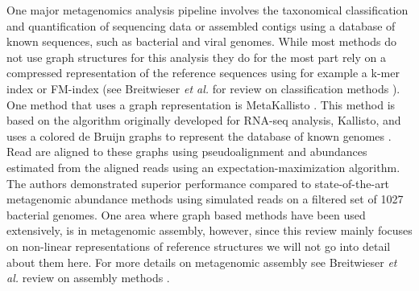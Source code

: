 One major metagenomics analysis pipeline involves the taxonomical classification and quantification of sequencing data or assembled contigs using a database of known sequences, such as bacterial and viral genomes. 
While most methods do not use graph structures for this analysis they do for the most part rely on a compressed representation of the reference sequences using for example a k-mer index or FM-index (see Breitwieser \textit{et al.} for review on classification methods \cite{Breitwieser2017-yp}). 
One method that uses a graph representation is MetaKallisto \cite{Schaeffer2017-fh}. 
This method is based on the algorithm originally developed for RNA-seq analysis, Kallisto, and uses a colored de Bruijn graphs to represent the database of known genomes \cite{Bray_2016}. 
Read are aligned to these graphs using pseudoalignment and abundances estimated from the aligned reads using an expectation-maximization algorithm. 
The authors demonstrated superior performance compared to state-of-the-art metagenomic abundance methods using simulated reads on a filtered set of 1027 bacterial genomes.
One area where graph based methods have been used extensively, is in metagenomic assembly, however, since this review mainly focuses on non-linear representations of reference structures we will not go into detail about them here. 
For more details on metagenomic assembly see Breitwieser \textit{et al.} review on assembly methods \cite{Breitwieser2017-yp}. 

